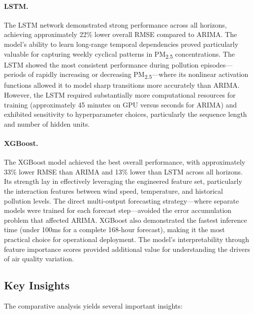 \paragraph{LSTM.}
The LSTM network demonstrated strong performance across all horizons, achieving approximately 22\% lower overall RMSE compared to ARIMA. The model's ability to learn long-range temporal dependencies proved particularly valuable for capturing weekly cyclical patterns in PM\textsubscript{2.5} concentrations. The LSTM showed the most consistent performance during pollution episodes---periods of rapidly increasing or decreasing PM\textsubscript{2.5}---where its nonlinear activation functions allowed it to model sharp transitions more accurately than ARIMA. However, the LSTM required substantially more computational resources for training (approximately 45 minutes on GPU versus seconds for ARIMA) and exhibited sensitivity to hyperparameter choices, particularly the sequence length and number of hidden units.

\paragraph{XGBoost.}
The XGBoost model achieved the best overall performance, with approximately 33\% lower RMSE than ARIMA and 13\% lower than LSTM across all horizons. Its strength lay in effectively leveraging the engineered feature set, particularly the interaction features between wind speed, temperature, and historical pollution levels. The direct multi-output forecasting strategy---where separate models were trained for each forecast step---avoided the error accumulation problem that affected ARIMA. XGBoost also demonstrated the fastest inference time (under 100ms for a complete 168-hour forecast), making it the most practical choice for operational deployment. The model's interpretability through feature importance scores provided additional value for understanding the drivers of air quality variation.

\subsection{Key Insights}

The comparative analysis yields several important insights:


